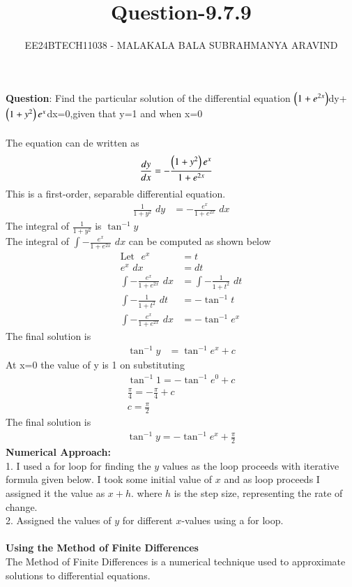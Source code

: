 \documentclass[journal]{IEEEtran}
\numberwithin{equation}{enumi}
\numberwithin{figure}{enumi}
\begin{document}

\title{Question-9.7.9}
\author{EE24BTECH11038 - MALAKALA BALA SUBRAHMANYA ARAVIND}
{\let\newpage\relax\maketitle}
\textbf{Question}:
Find the particular solution of the differential equation $\left(1+e^{2x}\right)$dy+$\left(1+y^2\right)e^x$dx=0,given that y=1 and when x=0 \\

\solution \\

The equation can de written as 
\begin{align}
    \frac{dy}{dx}&=-\frac{\left(1+y^2\right)e^x}{1+e^{2x}}
\end{align}
This is a first-order, separable differential equation.
\begin{align}
    \frac{1}{1+y^2}\,\,dy&=-\frac{e^x}{1+e^{2x}}\,\,dx
\end{align}
The integral of $\frac{1}{1+y^2}$ is $\tan^{-1}y$\\
The integral of $ \int -\frac{e^x}{1+e^{2x}}\,\,dx$ can be computed as shown below\\
\begin{align}
    \text{Let}\,\,\,\,e^{x}&=t\\
    e^x\,\,dx&=dt\\
    \int -\frac{e^x}{1+e^{2x}}\,\,dx &= \int -\frac{1}{1+t^2}\,\,dt\\
    \int -\frac{1}{1+t^2}\,\,dt&=-\tan^{-1}t\\
    \int -\frac{e^x}{1+e^{2x}}\,\,dx&=-\tan^{-1}{e^x}
\end{align}
The final solution is 
\begin{align}
    \tan^{-1}y&=\tan^{-1}{e^x}+c
\end{align}
At x=0 the value of y is 1 on substituting
\begin{align}
    \tan^{-1}{1}=-\tan^{-1}{e^0}+c\\
    \frac{\pi}{4}=-\frac{\pi}{4}+c\\
    c=\frac{\pi}{2}
\end{align}
The final solution is 
\begin{align}
    \tan^{-1}{y}=-\tan^{-1}{e^x}+\frac{\pi}{2}
\end{align}
\noindent\textbf{Numerical Approach:}\\1. I used a for loop for finding the $y$ values as the loop proceeds with iterative formula given below. I took some initial value of $x$ and as loop proceeds I assigned it the value as $x+h$. where $h$ is the step size, representing the rate of change. 
\\2. Assigned the values of $y$ for different $x$-values using a for loop. \\ 
\\ \textbf{Using the Method of Finite Differences}\\
The Method of Finite Differences is a numerical technique used to approximate solutions to differential equations. 
\end{document}
